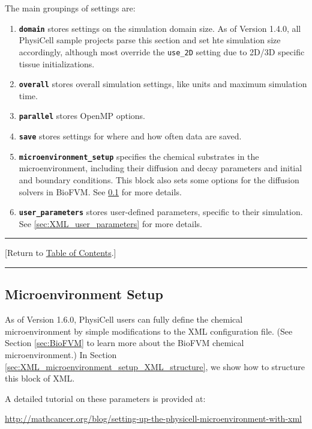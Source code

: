 \documentclass[12pt]{article}
\renewcommand{\v}{\verb}
\newcommand{\smallcode}[1]{\textbf{\texttt{#1}}}
\newcommand{\TOClink}{\begin{center}\hrule\vskip-5pt\phantom{.}\hfill[Return to \hyperlink{TOC}{Table of Contents}.]\hfill\phantom{.}\vskip3pt\hrule\end{center}}
\begin{document}
The main groupings of settings are: 
\begin{enumerate}
\item
\smallcode{domain} stores settings on the simulation domain size. As of 
Version 1.4.0, all PhysiCell sample projects parse this section and set hte 
simulation size accordingly, although most override the \v|use_2D| setting 
due to 2D/3D specific tissue initializations. 

\item
\smallcode{overall} stores overall simulation settings, like units 
and maximum simulation time. 

\item 
\smallcode{parallel} stores OpenMP options. 

\item 
\smallcode{save} stores settings for where and how often data are saved. 

\item 
\smallcode{microenvironment\_setup} specifies the chemical substrates in the microenvironment, 
including their diffusion and decay parameters and initial and boundary conditions. This block 
also sets some options for the diffusion solvers in BioFVM. 
See \ref{sec:XML_microenvironment_setup} for more details. 

\item 
\smallcode{user\_parameters} stores user-defined parameters, specific to their 
simulation. See \ref{sec:XML_user_parameters} for more details. 
\end{enumerate}

\TOClink 

\subsection{Microenvironment Setup}
\label{sec:XML_microenvironment_setup}
As of Version 1.6.0, PhysiCell users can fully define the chemical microenvironment by simple 
modifications to the XML configuration file. 
(See Section \ref{sec:BioFVM} to learn more about the BioFVM chemical microenvironment.) 
In Section \ref{sec:XML_microenvironment_setup_XML_structure}, we show how to 
structure this block of XML. 

A detailed tutorial on these parameters is provided at: 
\begin{center}
\href{http://mathcancer.org/blog/setting-up-the-physicell-microenvironment-with-xml}{http://mathcancer.org/blog/setting-up-the-physicell-microenvironment-with-xml}
\end{center}
\end{document}
